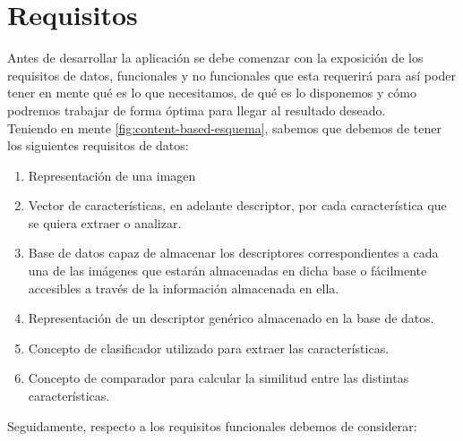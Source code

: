 \chapter{Requisitos}
Antes de desarrollar la aplicación se debe comenzar con la exposición de los requisitos de datos, funcionales y no funcionales que esta requerirá para así poder tener en mente qué es lo que necesitamos, de qué es lo disponemos y cómo podremos trabajar de forma óptima para llegar al resultado deseado.\\

Teniendo en mente \autoref{fig:content-based-esquema}, sabemos que debemos de tener los siguientes requisitos de datos:\\
\begin{enumerate}
\item Representación de una imagen
\item Vector de características, en adelante descriptor, por cada característica que se quiera extraer o analizar.
\item Base de datos capaz de almacenar los descriptores correspondientes a cada una de las imágenes que estarán almacenadas en dicha base o fácilmente accesibles a través de la información almacenada en ella.
\item Representación de un descriptor genérico almacenado en la base de datos.
\item Concepto de clasificador utilizado para extraer las características.
\item Concepto de comparador para calcular la similitud entre las distintas características.
\end{enumerate}
Seguidamente, respecto a los requisitos funcionales debemos de considerar:\\
